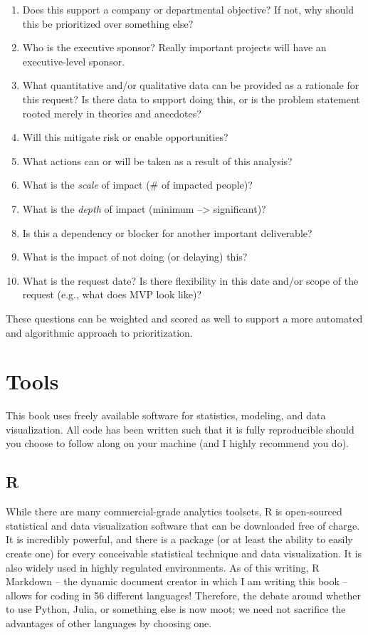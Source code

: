 \documentclass[]{book}
\providecommand{\tightlist}{%
  \setlength{\itemsep}{0pt}\setlength{\parskip}{0pt}}
\begin{document}
\begin{enumerate}
\def\labelenumi{\arabic{enumi}.}
\tightlist
\item
  Does this support a company or departmental objective? If not, why should this be prioritized over something else?
\item
  Who is the executive sponsor? Really important projects will have an executive-level sponsor.
\item
  What quantitative and/or qualitative data can be provided as a rationale for this request? Is there data to support doing this, or is the problem statement rooted merely in theories and anecdotes?
\item
  Will this mitigate risk or enable opportunities?
\item
  What actions can or will be taken as a result of this analysis?
\item
  What is the \emph{scale} of impact (\# of impacted people)?
\item
  What is the \emph{depth} of impact (minimum --\textgreater{} significant)?
\item
  Is this a dependency or blocker for another important deliverable?
\item
  What is the impact of not doing (or delaying) this?
\item
  What is the request date? Is there flexibility in this date and/or scope of the request (e.g., what does MVP look like)?
\end{enumerate}

These questions can be weighted and scored as well to support a more automated and algorithmic approach to prioritization.

\hypertarget{tools}{%
\section{Tools}\label{tools}}

This book uses freely available software for statistics, modeling, and data visualization. All code has been written such that it is fully reproducible should you choose to follow along on your machine (and I highly recommend you do).

\hypertarget{r}{%
\subsection{R}\label{r}}

While there are many commercial-grade analytics toolsets, R is open-sourced statistical and data visualization software that can be downloaded free of charge. It is incredibly powerful, and there is a package (or at least the ability to easily create one) for every conceivable statistical technique and data visualization. It is also widely used in highly regulated environments. As of this writing, R Markdown -- the dynamic document creator in which I am writing this book -- allows for coding in 56 different languages! Therefore, the debate around whether to use Python, Julia, or something else is now moot; we need not sacrifice the advantages of other languages by choosing one.
\end{document}
